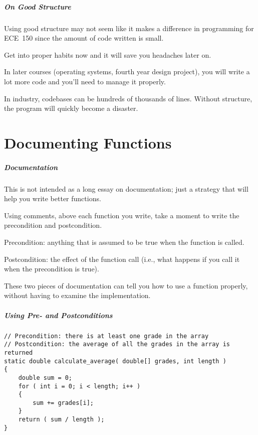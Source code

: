 \begin{frame}
\frametitle{On Good Structure}
Using good structure may not seem like it makes a difference in programming for ECE~150 since the amount of code written is small.

Get into proper habits now and it will save you headaches later on.

In later courses (operating systems, fourth year design project), you will write a lot more code and you'll need to manage it properly.

In industry, codebases can be hundreds of thousands of lines. Without structure, the program will quickly become a disaster.

\end{frame}

\part{Documenting Functions}
\begin{frame}\partpage\end{frame}

\begin{frame}
\frametitle{Documentation}
This is not intended as a long essay on documentation; just a strategy that will help you write better functions.

Using comments, above each function you write, take a moment to write the \alert{precondition} and \alert{postcondition}.

Precondition: anything that is assumed to be true when the function is called. 

Postcondition: the effect of the function call (i.e., what happens if you call it when the precondition is true).

These two pieces of documentation can tell you how to use a function properly, without having to examine the implementation.

\end{frame}

\begin{frame}[fragile]
\frametitle{Using Pre- and Postconditions}

{\scriptsize
\begin{verbatim}
// Precondition: there is at least one grade in the array
// Postcondition: the average of all the grades in the array is returned
static double calculate_average( double[] grades, int length )
{
    double sum = 0;
    for ( int i = 0; i < length; i++ )
    {
        sum += grades[i];
    }
    return ( sum / length ); 
}
\end{verbatim}
}

\end{frame}

